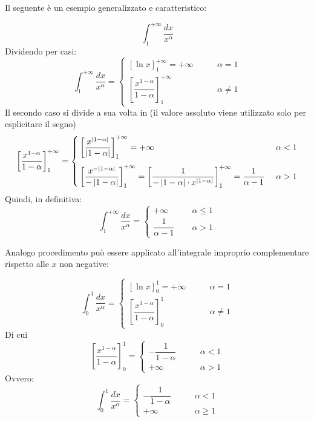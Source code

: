 Il seguente è un esempio generalizzato e caratteristico:
\begin{examp}
	\[
		\int_1^{+\infty}\frac{dx}{x^\alpha}
	\]
	Dividendo per casi:
	\[
		\int_1^{+\infty}\frac{dx}{x^\alpha}=
		\begin{cases}
			[\ln x]_1^{+\infty}=+\infty\qquad                             & \alpha=1    \\[1ex]
			\left[\dfrac{x^{1-\alpha}}{1-\alpha}\right]_1^{+\infty}\qquad & \alpha\neq1
		\end{cases}
	\]
	Il secondo caso si divide a sua volta in (il valore assoluto viene utilizzato solo per esplicitare il segno)
	\[
		\left[\dfrac{x^{1-\alpha}}{1-\alpha}\right]_1^{+\infty}=
		\begin{cases}
			\left[\dfrac{x^{\left\lvert 1-\alpha \right\rvert}}{\left\lvert 1-\alpha \right\rvert}\right]_1^{+\infty}=+\infty\quad                                                                                        & \alpha<1 \\[3ex]
			\left[\dfrac{x^{-\left\lvert 1-\alpha \right\rvert}}{-\left\lvert 1-\alpha \right\rvert}\right]_1^{+\infty}=\left[\dfrac{1}{-\left\lvert 1-\alpha \right\rvert\cdot x^{\left\lvert 1-\alpha \right\rvert}}\right]_1^{+\infty}=\dfrac{1}{\alpha-1} ~ & \alpha>1
		\end{cases}
	\]
	Quindi, in definitiva:
	\[
		\int_1^{+\infty}\frac{dx}{x^\alpha}=
		\begin{cases}
			+\infty\qquad            & \alpha\leq1 \\[1ex]
			\dfrac{1}{\alpha-1}\quad & \alpha>1
		\end{cases}
	\]
\end{examp}

Analogo procedimento può essere applicato all'integrale improprio complementare rispetto alle $x$ non negative:
\begin{examp}
	\[
		\int_0^1\frac{dx}{x^\alpha}=
		\begin{cases}
			[\ln x]_0^1=+\infty\qquad                             & \alpha=1    \\[1ex]
			\left[\dfrac{x^{1-\alpha}}{1-\alpha}\right]_0^1\qquad & \alpha\neq1
		\end{cases}
	\]
	Di cui
	\[
		\left[\dfrac{x^{1-\alpha}}{1-\alpha}\right]_0^1=
		\begin{cases}
			-\dfrac{1}{1-\alpha}\qquad & \alpha<1 \\[1ex]
			+\infty\qquad              & \alpha>1
		\end{cases}
	\]
	Ovvero:
	\[
		\int_0^1\frac{dx}{x^\alpha}=
		\begin{cases}
			-\dfrac{1}{1-\alpha}\qquad & \alpha<1    \\[1ex]
			+\infty\qquad              & \alpha\geq1
		\end{cases}
	\]
\end{examp}

